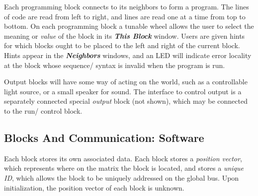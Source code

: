 Each programming block connects to its neighbors to form a program. The lines of  code are read from left to right, and lines are read one at a time from top to bottom. On each programming block a tunable wheel allows the user to select the meaning or \textit{value} of the block  in its \textbf{\textit{This Block}} window.  Users are given hints for which blocks ought to be placed to the left and right of the current block. Hints appear in the \textbf{\textit{Neighbors}} windows, and an LED will indicate error locality at the block whose sequence/ syntax is invalid when the program is run. 

Output blocks will have some way of acting on the world, such as a controllable light source, or a small speaker for sound. The interface to control  output is a separately connected  special \textit{output} block (not shown), which may be connected to the run/ control block.


 
  \subsection{Blocks And Communication: Software}
    Each block stores its own associated data. Each block stores a \textit{position vector}, which represents where on the matrix the block is located, and stores a \textit{unique ID}, which allows the block to be uniquely addressed on the global bus. Upon initialization, the position vector of each block is unknown.
  
   

